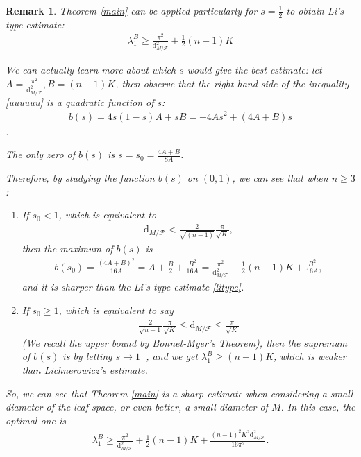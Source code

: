 \documentclass[11pt]{amsart}
\newtheorem{remark}[prop]{Remark}
\def\d{\mathrm{d}}
\begin{document}
\begin{remark}
    Theorem \ref{main} can be applied particularly for $s=\frac{1}{2}$ to obtain Li's type estimate:
    \begin{align}\label{litype}
        \lambda_1^B\geq\frac{\pi^2}{\d_{M/\mathcal{F}}^2}+\frac{1}{2}(n-1)K
    \end{align}

    We can actually learn more about which $s$ would give the best estimate: let $A=\frac{\pi^2}{\d_{M/\mathcal{F}}^2},B=(n-1)K$, then observe that the right hand side of the inequality \ref{uuuuuu} is a quadratic function of $s$:
    \begin{align*}
        b(s)=4s(1-s)A+sB=-4As^2+(4A+B)s
    \end{align*}.

    The only zero of $b(s)$ is $s=s_0=\frac{4A+B}{8A}$.

    Therefore, by studying the function $b(s)$ on $(0,1)$, we can see that when $n\geq 3$:
    \begin{enumerate}
        \item If $s_0<1$, which is equivalent to
        \begin{align*}
            \d_{M/\mathcal{F}}<\frac{2}{\sqrt{(n-1)}}\frac{\pi}{\sqrt{K}},
        \end{align*}then the maximum of $b(s)$ is \begin{align*}
            b(s_0)=\frac{(4A+B)^2}{16A}=A+\frac{B}{2}+\frac{B^2}{16A}=\frac{\pi^2}{\d^2_{M/\mathcal{F}}}+\frac{1}{2}(n-1)K+\frac{B^2}{16A},
        \end{align*} and it is sharper than the Li's type estimate \ref{litype}.
        \item If $s_0\geq 1$, which is equivalent to say
        \begin{align*}
            \frac{2}{\sqrt{n-1}}\frac{\pi}{\sqrt{K}}\leq\d_{M/\mathcal{F}}\leq\frac{\pi}{\sqrt{K}}
        \end{align*} (We recall the upper bound by Bonnet-Myer's Theorem), then the supremum of $b(s)$ is by letting $s\to 1^-$, and we get $\lambda_1^B\geq (n-1)K$, which is weaker than Lichnerowicz's estimate. 
    \end{enumerate}

    So, we can see that Theorem \ref{main} is a sharp estimate when considering a small diameter of the leaf space, or even better, a small diameter of $M$. In this case, the optimal one is 
    \begin{align*}
        \lambda_1^B\geq\frac{\pi^2}{\d_{M/\mathcal{F}}^2}+\frac{1}{2}(n-1)K+\frac{(n-1)^2K^2\d_{M/\mathcal{F}}^2}{16\pi^2}.
    \end{align*}
\end{remark}
\end{document}
